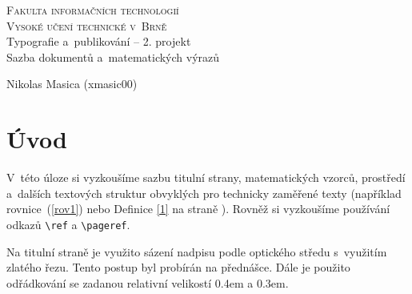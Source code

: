 \documentclass[a4paper, 11pt, twocolumn]{article}
\theoremstyle{definition}
\theoremstyle{definition}
\begin{document}
\begin{titlepage}
		\begin{center}
			{\Huge\textsc{
				Fakulta informačních technologií\\[0.4em]
				Vysoké učení technické v~Brně}} \\
			{\LARGE
				 Typografie a~publikování -- 2. projekt\\[0.3em]
				Sazba dokumentů a~matematických výrazů
			}
		\end{center}

		{\Large
			\the\year
			\hfill
			Nikolas Masica (xmasic00)
		}
	\end{titlepage}
\date{March 2018}



\section*{Úvod}
V~této úloze si vyzkoušíme sazbu titulní strany, matematických vzorců, prostředí a~dalších textových struktur obvyklých pro technicky zaměřené texty (například rovnice~(\ref{rov1}) nebo Definice \ref{1} na straně \pageref{page1}). Rovněž si vyzkoušíme používání odkazů \verb|\ref| a \verb|\pageref|.

Na titulní straně je využito sázení nadpisu podle optického středu s~využitím zlatého řezu. Tento postup byl probírán na přednášce. Dále je použito odřádkování se zadanou relativní velikostí 0.4em a 0.3em.
\end{document}
